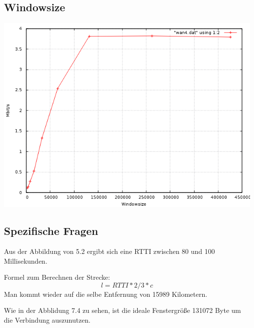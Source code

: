 \documentclass[a4paper,10pt]{article}
\begin{document}
\subsection{Windowsize}
\includegraphics[scale=0.75]{wan4_windows.png}

\subsection{Spezifische Fragen}
\begin{itemize} 
 \item Aus der Abbildung von 5.2 ergibt sich eine RTTI zwischen 80 und 100 Millisekunden.
 \item {Formel zum Berechnen der Strecke: 
 \begin{equation}
  l=RTTI*2/3*c
 \end{equation}
 Man kommt wieder auf die selbe Entfernung von 15989 Kilometern.
 \item Wie in der Abblidung 7.4 zu sehen, ist die ideale Fenstergröße 131072 Byte um die Verbindung auszunutzen.}
\end{itemize}
 
\end{document}
